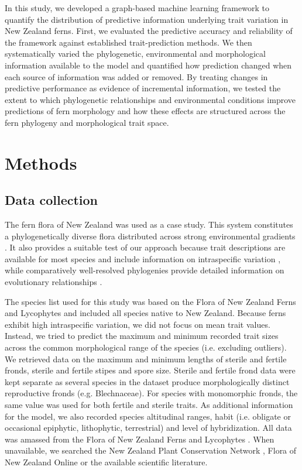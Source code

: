 \documentclass[preprint,12pt,authoryear]{elsarticle}
\begin{document}
In this study, we developed a graph-based machine learning framework to quantify the distribution of predictive information underlying trait variation in New Zealand ferns. First, we evaluated the predictive accuracy and reliability of the framework against established trait-prediction methods. We then systematically varied the phylogenetic, environmental and morphological information available to the model and quantified how prediction changed when each source of information was added or removed. By treating changes in predictive performance as evidence of incremental information, we tested the extent to which phylogenetic relationships and environmental conditions improve predictions of fern morphology and how these effects are structured across the fern phylogeny and morphological trait space.

\section{Methods}
\subsection{Data collection}
The fern flora of New Zealand was used  as a case study. This system constitutes a phylogenetically diverse flora distributed across strong environmental gradients \citep{mountier2018patterns}. It also provides a suitable test of our approach because trait descriptions are available for most species and include information on intraspecific variation \citep{brownsey2014flora}, while comparatively well-resolved phylogenies provide detailed information on evolutionary relationships \citep{nitta2022open}.

The species list used for this study was based on the Flora of New Zealand Ferns and Lycophytes \citep{brownsey2014flora} and included all species native to New Zealand. Because ferns exhibit high intraspecific variation, we did not focus on mean trait values. Instead, we tried to predict the maximum and minimum recorded trait sizes across the common morphological range of the species (i.e. excluding outliers). We retrieved data on the maximum and minimum lengths of sterile and fertile fronds, sterile and fertile stipes and spore size. Sterile and fertile frond data were kept separate as several species in the dataset produce morphologically distinct reproductive fronds (e.g. Blechnaceae). For species with monomorphic fronds, the same value was used for both fertile and sterile traits. As additional information for the model, we also recorded species altitudinal ranges, habit (i.e. obligate or occasional epiphytic, lithophytic, terrestrial) and level of hybridization. All data was amassed from the Flora of New Zealand Ferns and Lycophytes \citep{brownsey2014flora}. When unavailable, we searched the New Zealand Plant Conservation Network \citep{nzpcn_website}, Flora of New Zealand Online \citep{flora_of_nz_website} or the available scientific literature.
\end{document}
